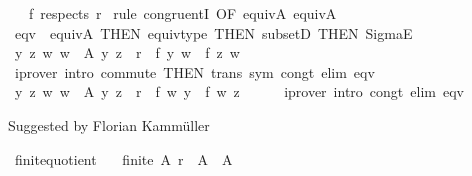 \begin{isabellebody}
\ \ \ {\isachardoublequoteopen}f\ respects{}\ r{\isachardoublequoteclose}\isanewline
%
\isadelimproof
%
\endisadelimproof
%
\isatagproof
{}\isamarkupfalse%
\ {\isacharparenleft}{\kern0pt}rule\ congruent{}I\ {\isacharbrackleft}{\kern0pt}OF\ equivA\ equivA{\isacharbrackright}{\kern0pt}{\isacharparenright}{\kern0pt}\isanewline
\ \ \isamarkupfalse%
\ eqv\ {\isacharequal}{\kern0pt}\ equivA\ {\isacharbrackleft}{\kern0pt}THEN\ equiv{\isacharunderscore}{\kern0pt}type{\isacharcomma}{\kern0pt}\ THEN\ subsetD{\isacharcomma}{\kern0pt}\ THEN\ SigmaE{}{\isacharbrackright}{\kern0pt}\isanewline
\ \ \isamarkupfalse%
\ {\isachardoublequoteopen}{\isasymAnd}y\ z\ w{\isachardot}{\kern0pt}\ {\isasymlbrakk}w\ {\isasymin}\ A{\isacharsemicolon}{\kern0pt}\ {\isacharparenleft}{\kern0pt}y{\isacharcomma}{\kern0pt}\ z{\isacharparenright}{\kern0pt}\ {\isasymin}\ r{\isasymrbrakk}\ {\isasymLongrightarrow}\ f\ y\ w\ {\isacharequal}{\kern0pt}\ f\ z\ w{\isachardoublequoteclose}\isanewline
\ \ \ \ \isamarkupfalse%
\ {\isacharparenleft}{\kern0pt}iprover\ intro{\isacharcolon}{\kern0pt}\ commute\ {\isacharbrackleft}{\kern0pt}THEN\ trans{\isacharbrackright}{\kern0pt}\ sym\ congt\ elim{\isacharcolon}{\kern0pt}\ eqv{\isacharparenright}{\kern0pt}\isanewline
\ \ \isamarkupfalse%
\ {\isachardoublequoteopen}{\isasymAnd}y\ z\ w{\isachardot}{\kern0pt}\ {\isasymlbrakk}w\ {\isasymin}\ A{\isacharsemicolon}{\kern0pt}\ {\isacharparenleft}{\kern0pt}y{\isacharcomma}{\kern0pt}\ z{\isacharparenright}{\kern0pt}\ {\isasymin}\ r{\isasymrbrakk}\ {\isasymLongrightarrow}\ f\ w\ y\ {\isacharequal}{\kern0pt}\ f\ w\ z{\isachardoublequoteclose}\isanewline
\ \ \ \ \isamarkupfalse%
\ {\isacharparenleft}{\kern0pt}iprover\ intro{\isacharcolon}{\kern0pt}\ congt\ elim{\isacharcolon}{\kern0pt}\ eqv{\isacharparenright}{\kern0pt}\isanewline
{}\isamarkupfalse%
%
\endisatagproof
{\isafoldproof}%
%
\isadelimproof
%
\endisadelimproof
%
\isadelimdocument
%
\endisadelimdocument
%
\isatagdocument
%
\isamarkuptrue%
%
\endisatagdocument
{\isafolddocument}%
%
\isadelimdocument
%
\endisadelimdocument
%
\begin{isamarkuptext}%
Suggested by Florian Kammüller%
\end{isamarkuptext}\isamarkuptrue%
\isamarkupfalse%
\ finite{\isacharunderscore}{\kern0pt}quotient{\isacharcolon}{\kern0pt}\isanewline
\ \ \ {\isachardoublequoteopen}finite\ A{\isachardoublequoteclose}\ {\isachardoublequoteopen}r\ {\isasymsubseteq}\ A\ {\isasymtimes}\ A{\isachardoublequoteclose}\isanewline

\end{isabellebody}
